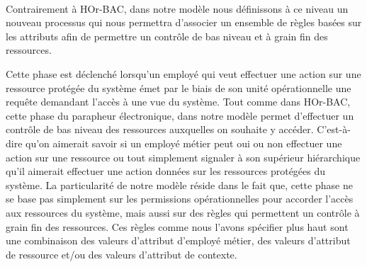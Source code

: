 
\paragraph{} Contrairement à HOr-BAC, dans notre modèle nous définissons à ce niveau un nouveau processus qui nous permettra d'associer un ensemble de règles basées sur les attributs afin de permettre un contrôle de bas niveau et à grain fin des ressources.
  


\label{sectionPhaseEmission}


Cette phase est déclenché lorsqu'un employé qui veut effectuer une action sur une ressource protégée du système émet par le biais de son unité opérationnelle une requête demandant l'accès à une vue du système. Tout comme dans HOr-BAC, cette phase du parapheur électronique, dans notre modèle permet d'effectuer un contrôle de bas niveau des ressources auxquelles on souhaite y accéder. C'est-à-dire qu'on aimerait savoir si un employé métier peut oui ou non effectuer une action sur une ressource ou tout simplement signaler à son supérieur hiérarchique qu'il aimerait effectuer une action données sur les ressources protégées du système. La particularité de notre modèle réside dans le fait que, cette phase ne se base pas simplement sur les permissions opérationnelles pour accorder l'accès aux ressources du système, mais aussi sur des règles qui permettent un contrôle à grain fin des ressources. Ces règles comme nous l'avons spécifier plus haut sont une combinaison des valeurs d'attribut d'employé métier, des valeurs d'attribut de ressource et/ou des valeurs d'attribut de contexte. 

